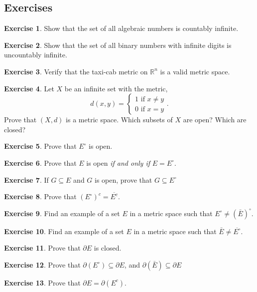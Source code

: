 \documentclass{article}
\newcommand{\R}{\mathbb{R}}
\theoremstyle{definition}
\newtheorem{ex}{Exercise}[section]
\begin{document}
\subsection{Exercises}
\begin{ex}
	Show that the set of all algebraic numbers is countably infinite.
\end{ex}
\begin{ex}
	Show that the set of all binary numbers with infinite digits is uncountably infinite.
\end{ex}
\begin{ex}
	Verify that the taxi-cab metric on $ \R^n $ is a valid metric space.
\end{ex}
\begin{ex}
	Let $ X $ be an infinite set with the metric, $$d(x,y)=\begin{cases}
		1\text{ if }x\neq y\\
	0\text{ if }x=y
	\end{cases} .$$ Prove that $ (X,d) $ is a metric space. Which subsets of $ X $ are open? Which are closed? 
\end{ex}
\begin{ex}
	Prove that $ E^\circ $ is open.
\end{ex}
\begin{ex}
	Prove that $ E $ is open \textit{if and only if} $ E=E^\circ $.
\end{ex}
\begin{ex}
	If $ G\subseteq E $ and $ G $ is open, prove that $ G\subseteq E^\circ $
\end{ex}
\begin{ex}
	Prove that $ (E^\circ)^c=\overline{E^c} $.
\end{ex}
\begin{ex}
	Find an example of a set $ E  $ in a metric space such that $ E^\circ\neq(\bar{E} )^\circ$.
\end{ex}
\begin{ex}
	Find an example of a set $ E  $ in a metric space such that $ \bar{E}\neq\overline{E^\circ}$.
\end{ex}
\begin{ex}
	Prove that $ \partial E $ is closed.
\end{ex}
\begin{ex}
	Prove that $ \partial(E^\circ)\subseteq \partial E  $, and $ \partial(\bar{E})\subseteq \partial E  $
\end{ex}
\begin{ex}
	Prove that $ \partial E=\partial (E^c)  $.
\end{ex}
\end{document}
